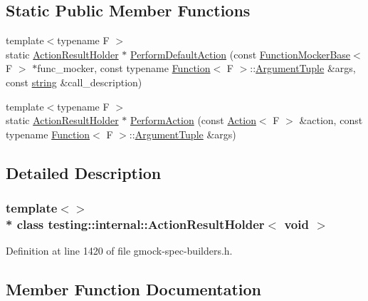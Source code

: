 \subsection*{Static Public Member Functions}
\begin{DoxyCompactItemize}
\item 
{\footnotesize template$<$typename F $>$ }\\static \hyperlink{classtesting_1_1internal_1_1_action_result_holder}{Action\+Result\+Holder} $\ast$ \hyperlink{classtesting_1_1internal_1_1_action_result_holder_3_01void_01_4_a140b6ab6a756e60db62e76b01b09a26f}{Perform\+Default\+Action} (const \hyperlink{classtesting_1_1internal_1_1_function_mocker_base}{Function\+Mocker\+Base}$<$ F $>$ $\ast$func\+\_\+mocker, const typename \hyperlink{structtesting_1_1internal_1_1_function}{Function}$<$ F $>$\+::\hyperlink{typedefs__d_8js_a396b2bdc7ef45f482a7e9254b15c3c01}{Argument\+Tuple} \&args, const \hyperlink{namespacetesting_1_1internal_a8e8ff5b11e64078831112677156cb111}{string} \&call\+\_\+description)
\item 
{\footnotesize template$<$typename F $>$ }\\static \hyperlink{classtesting_1_1internal_1_1_action_result_holder}{Action\+Result\+Holder} $\ast$ \hyperlink{classtesting_1_1internal_1_1_action_result_holder_3_01void_01_4_abb1d387e21341393e0c237ae7b02ee68}{Perform\+Action} (const \hyperlink{classtesting_1_1_action}{Action}$<$ F $>$ \&action, const typename \hyperlink{structtesting_1_1internal_1_1_function}{Function}$<$ F $>$\+::\hyperlink{typedefs__d_8js_a396b2bdc7ef45f482a7e9254b15c3c01}{Argument\+Tuple} \&args)
\end{DoxyCompactItemize}


\subsection{Detailed Description}
\subsubsection*{template$<$$>$\\*
class testing\+::internal\+::\+Action\+Result\+Holder$<$ void $>$}



Definition at line 1420 of file gmock-\/spec-\/builders.\+h.



\subsection{Member Function Documentation}

